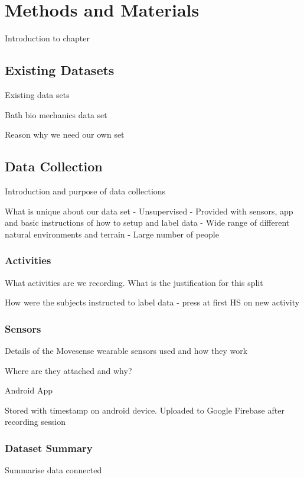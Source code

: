 \chapter{Methods and Materials}
Introduction to chapter



\section{Existing Datasets}
Existing data sets

Bath bio mechanics data set

Reason why we need our own set



\section{Data Collection}
Introduction and purpose of data collections

What is unique about our data set
- Unsupervised - Provided with sensors, app and basic instructions of how to setup and label data
- Wide range of different natural environments and terrain
- Large number of people

\subsection{Activities}
What activities are we recording. What is the justification for this split


How were the subjects instructed to label data - press at first HS on new activity

\subsection{Sensors}
Details of the Movesense wearable sensors used and how they work

Where are they attached and why?

Android App

Stored with timestamp on android device. Uploaded to Google Firebase after recording session

\subsection{Dataset Summary}
Summarise data connected

